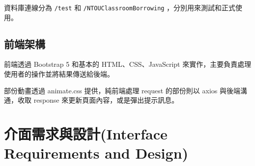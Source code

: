 \documentclass{article}
\begin{document}
資料庫連線分為 \verb|/test| 和 \verb|/NTOUClassroomBorrowing| ，分別用來測試和正式使用。

\subsection{前端架構}

前端透過 Bootstrap 5 和基本的 HTML、CSS、JavaScript 來實作，主要負責處理使用者的操作並將結果傳送給後端。

部份動畫透過 animate.css 提供，純前端處理 request 的部份則以 axios 與後端溝通，收取 response 來更新頁面內容，或是彈出提示訊息。

\newpage

\section[介面需求與設計(INTERFACE REQUIREMENTS AND DESIGN)]{介面需求與設計(Interface Requirements and Design)}

\newcommand{\IRTable}[6]{
	\begin{tabularx}{0.95\textwidth}{|c|Y|Y|}
		\hline
		\rowcolor{LightGray} 介面名稱              & 介面提供者                & 介面使用者                 \\
		\rowcolor{LightGray} (Interface Name)  & (Interface Provider) & (Interface Consumer)  \\ \hline
		#1                                     & #2                   & #3                    \\ \hline
		\rowcolor{LightGray} 連結方式              & 輸入資料                 & 輸出資料                  \\
		\rowcolor{LightGray} (Connection Type) & (Input Data)         & (Output Data)         \\ \hline
		#4                                     & \usebox\jsoninputbox & \usebox\jsonoutputbox \\ \hline
		\rowcolor{LightGray} \multicolumn{3}{|c|}{ URL }                                      \\ \hline
		\multicolumn{3}{|c|}{\texttt{#5}}                                                     \\ \hline
		\rowcolor{LightGray} \multicolumn{3}{|c|}{  介面描述 (Interface Description) }            \\ \hline
		\multicolumn{3}{|c|}{#6}                                                              \\ \hline
	\end{tabularx}
}
\end{document}
